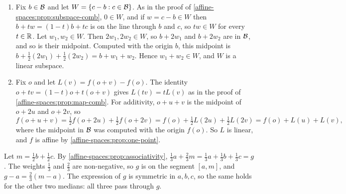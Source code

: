 \begin{enumerate}[nosep]
  \item Fix $b\in\mathcal{B}$ and let $W = \{c - b : c\in\mathcal{B}\}$. As in the proof of
        \cref{affine-spaces:prop:subspace-comb}, $0\in W$, and if
        $w = c - b\in W$ then $b + tw = (1 - t)b + tc$ is on the line
        through $b$ and $c$, so $tw\in W$ for every $t\in\mathbb{R}$. Let
        $w_1, w_2\in W$. Then $2w_1, 2w_2\in W$, so $b + 2w_1$ and
        $b + 2w_2$ are in $\mathcal{B}$, and so is their midpoint. Computed with
        the origin $b$, this midpoint is
        $b + \frac12(2w_1) + \frac12(2w_2) = b + w_1 + w_2$. Hence
        $w_1 + w_2\in W$, and $W$ is a linear subspace.
  \item Fix $o$ and let $L(v) = f(o + v) - f(o)$. The identity
        $o + tv = (1 - t)o + t(o + v)$ gives $L(tv) = tL(v)$ as in the
        proof of \cref{affine-spaces:prop:map-comb}. For additivity,
        $o + u + v$ is the midpoint of $o + 2u$ and $o + 2v$, so
        \[
          f(o + u + v) = \tfrac12f(o + 2u) + \tfrac12f(o + 2v)
          = f(o) + \tfrac12L(2u) + \tfrac12L(2v) = f(o) + L(u) + L(v) ,
        \]
        where the midpoint in $\mathcal{B}$ was computed with the origin $f(o)$.
        So $L$ is linear, and $f$ is affine by
        \cref{affine-spaces:prop:one-point}.
\end{enumerate}

Let $m = \frac12b + \frac12c$. By
\cref{affine-spaces:prop:associativity},
$\frac13a + \frac23m = \frac13a + \frac13b + \frac13c = g$. The weights
$\frac13$ and $\frac23$ are non-negative, so $g$ is on the segment
$[a, m]$, and $g - a = \frac23(m - a)$. The expression of $g$ is symmetric
in $a, b, c$, so the same holds for the other two medians: all three pass
through $g$.

